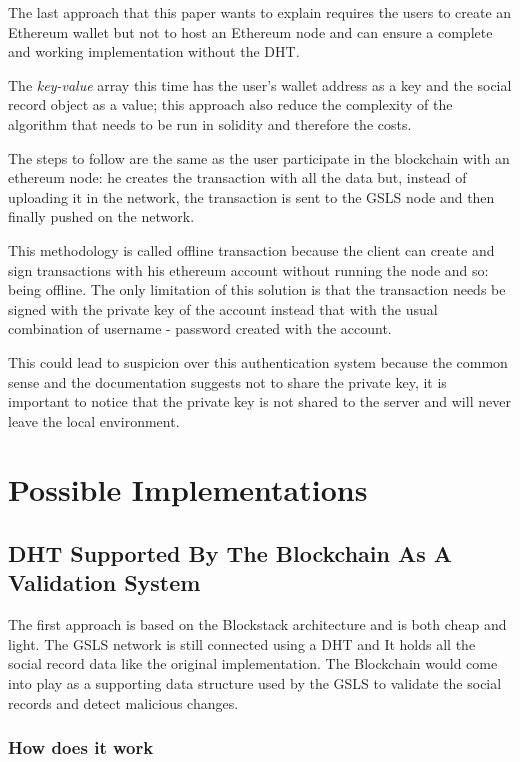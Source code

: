 The last approach that this paper wants to explain requires the users to create an Ethereum wallet but not to host an Ethereum node and can ensure a complete and working implementation without the DHT.

The \textit{key-value} array this time has the user's wallet address as a key and the social record object as a value; this approach also reduce the complexity of the algorithm that needs to be run in solidity and therefore the costs.

The steps to follow are the same as the user participate in the blockchain with an ethereum node: he creates the transaction with all the data but, instead of uploading it in the network, the transaction is sent to the GSLS node and then finally pushed on the network.

This methodology is called offline transaction because the client can create and sign transactions with his ethereum account without running the node and so: being offline. The only limitation of this solution is that the transaction needs be signed with the private key of the account instead that with the usual combination of username - password created with the account.

This could lead to suspicion over this authentication system because the common sense and the documentation suggests not to share the private key, it is important to notice that the private key is not shared to the server and will never leave the local environment.


\section{Possible Implementations}

\subsection{DHT Supported By The Blockchain As A Validation System}
The first approach is based on the Blockstack architecture and is both cheap and light. The GSLS network is still connected using a DHT and It holds all the social record data like the original implementation. The Blockchain would come into play as a supporting data structure used by the GSLS to validate the social records and detect malicious changes.

\subsubsection{How does it work}
